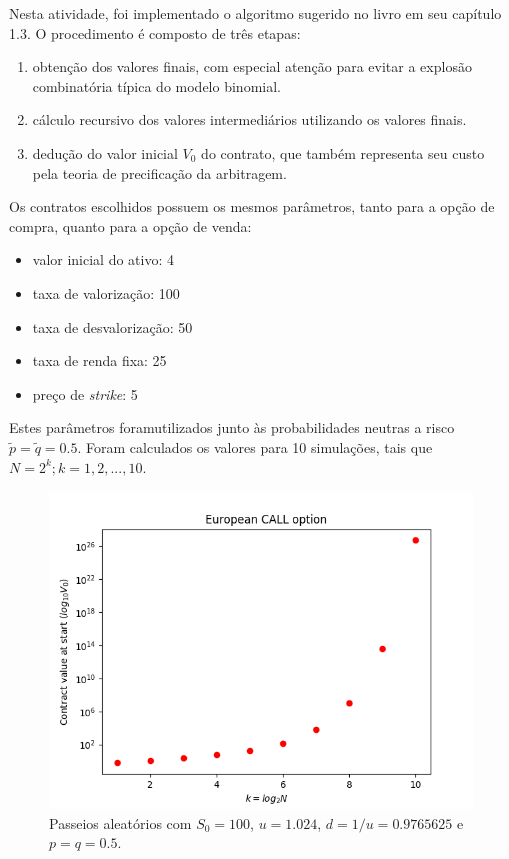 \documentclass{article}
\begin{document}
Nesta atividade, foi implementado o algoritmo sugerido no livro em seu capítulo 1.3.
O procedimento é composto de três etapas:

\begin{enumerate}
	\item obtenção dos valores finais, com especial atenção para evitar a explosão combinatória típica do modelo binomial.
	\item cálculo recursivo dos valores intermediários utilizando os valores finais.
	\item dedução do valor inicial $V_{0}$ do contrato, que também representa seu custo pela teoria de precificação da arbitragem.
\end{enumerate}

Os contratos escolhidos possuem os mesmos parâmetros, tanto para a opção de compra, quanto para a opção de venda:

\begin{itemize}
	\item valor inicial do ativo: 4
	\item taxa de valorização: 100%
	\item taxa de desvalorização: 50%
	\item taxa de renda fixa: 25%
	\item preço de \emph{strike}: 5
\end{itemize}

Estes parâmetros foramutilizados junto às probabilidades neutras a risco $\tilde{p} = \tilde{q} = 0.5$.
Foram calculados os valores para 10 simulações, tais que $N = 2^{k}; k = 1, 2, ..., 10$.



\begin{figure}[]
	\includegraphics[width=\linewidth]{Figure_1.png}
	\centering
	
	\caption{Passeios aleatórios com $S_{0} = 100$, $u = 1.024$, $d = 1/u = 0.9765625$ e $p = q = 0.5$.}
	\label{}
\end{figure}
\end{document}
